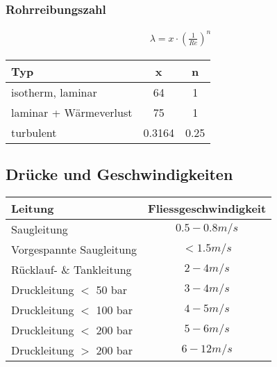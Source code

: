 \subsubsection{Rohrreibungszahl}
\begin{align*}
\lambda = x \cdot \left( \frac{1}{Re} \right)^n
\end{align*}

\begin{tabular}{lcc}
Typ & x & n \\
\hline
isotherm, laminar & 64 & 1 \\
laminar + Wärmeverlust & 75 & 1 \\
turbulent & 0.3164 & 0.25
\end{tabular}



\subsection{Drücke und Geschwindigkeiten}

\begin{tabular}{l|c}
    \textbf{Leitung} & \textbf{Fliessgeschwindigkeit} \\
    \hline
    Saugleitung & $0.5 - 0.8 m/s$ \\
    Vorgespannte Saugleitung & $< 1.5 m/s$ \\
    Rücklauf- \& Tankleitung & $2 - 4 m/s$ \\
    Druckleitung $<$ 50 bar & $3 - 4 m/s$ \\
    Druckleitung $<$ 100 bar & $4 - 5 m/s$ \\
    Druckleitung $<$ 200 bar & $5 - 6 m/s$ \\
    Druckleitung $>$ 200 bar & $6 - 12 m/s$
\end{tabular}
